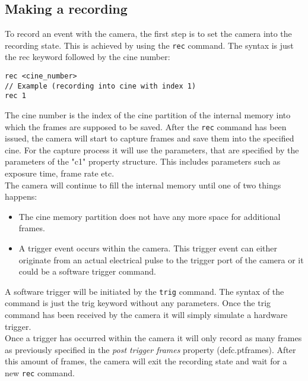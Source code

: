 \subsection{Making a recording}
To record an event with the camera, the first step is to set the camera into the recording state. This is achieved by using the \texttt{rec} command. The syntax is just the rec keyword followed by the cine number:
\begin{lstlisting}
rec <cine_number>
// Example (recording into cine with index 1)
rec 1
\end{lstlisting}
The cine number is the index of the cine partition of the internal memory into which the frames are supposed to be saved. After the \texttt{rec} command has been issued, the camera will start to capture frames and save them into the specified cine. For the capture process it will use the parameters, that are specified by the parameters of the "c1" property structure. This includes parameters such as exposure time, frame rate etc.\\
The camera will continue to fill the internal memory until one of two things happens: 
\begin{itemize}
\item The cine memory partition does not have any more space for additional frames.
\item A trigger event occurs within the camera. This trigger event can either originate from an actual electrical pulse to the trigger port of the camera or it could be a software trigger command.
\end{itemize}

A software trigger will be initiated by the \texttt{trig} command. The syntax of the command is just the trig keyword without any parameters. Once the trig command has been received by the camera it will simply simulate a hardware trigger.\\
Once a trigger has occurred within the camera it will only record as many frames as previously specified in the \textit{post trigger frames} property (defc.ptframes). After this amount of frames, the camera will exit the recording state and wait for a new \texttt{rec} command.

